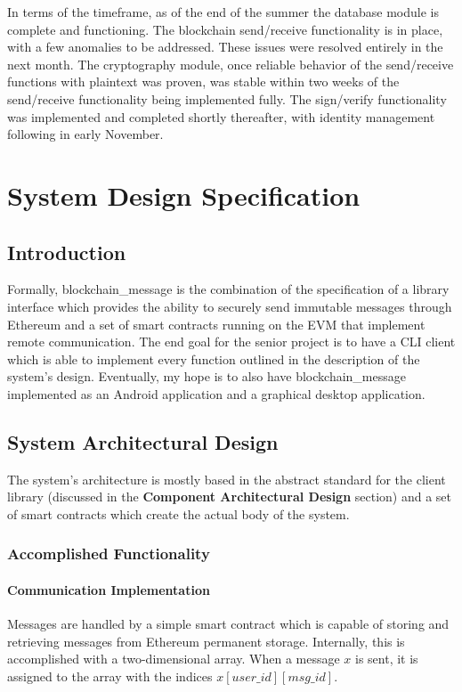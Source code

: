 \documentclass[titlepage]{report}
\begin{document}
In terms of the timeframe, as of the end of the summer the database module is complete and functioning. The blockchain send/receive functionality is in place, with a few anomalies to be addressed. These issues were resolved entirely in the next month. The cryptography module, once reliable behavior of the send/receive functions with plaintext was proven, was stable within two weeks of the send/receive functionality being implemented fully. The sign/verify functionality was implemented and completed shortly thereafter, with identity management following in early November.

\chapter{System Design Specification}
\section{Introduction}
Formally, blockchain\_message is the combination of the specification of a library interface which provides the ability to securely send immutable messages through \gls{Ethereum} and a set of smart contracts running on the EVM that implement remote communication. The end goal for the senior project is to have a CLI client which is able to implement every function outlined in the description of the system's design. Eventually, my hope is to also have blockchain\_message implemented as an Android application and a graphical desktop application.

\section{System Architectural Design}
The system's architecture is mostly based in the abstract standard for the client library (discussed in the \textbf{Component Architectural Design} section) and a set of \glspl{smart contract} which create the actual body of the system.

\subsection{Accomplished Functionality}
\subsubsection{Communication Implementation}
Messages are handled by a simple \gls{smart contract} which is capable of storing and retrieving messages from \gls{Ethereum} permanent storage. Internally, this is accomplished with a two-dimensional array. When a message $x$ is sent, it is assigned to the array with the indices $x[user\_id][msg\_id]$.
\end{document}

